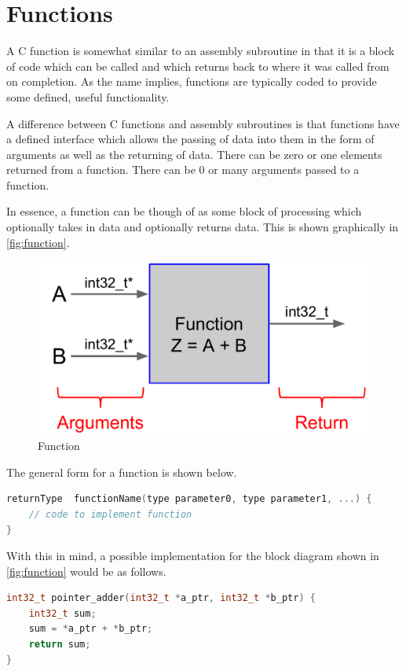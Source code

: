 \chapter{Functions}
A C function is somewhat similar to an assembly subroutine in that it is a block of code which can be called and which returns back to where it was called from on completion. As the name implies, functions are typically coded to provide some defined, useful functionality. 

A difference between C functions and assembly subroutines is that functions have a defined interface which allows the passing of data into them in the form of arguments as well as the returning of data. There can be zero or one elements returned from a function. There can be 0 or many arguments passed to a function.

In essence, a function can be though of as some block of processing which optionally takes in data and optionally returns data. This is shown graphically in \autoref{fig:function}.

\begin{figure}
\centering
\includegraphics[scale=0.5]{./fig/function.pdf}
\caption{Function}
\label{fig:function}
\end{figure}

The general form for a function is shown below.

\begin{lstlisting}[language=c]
returnType  functionName(type parameter0, type parameter1, ...) {
    // code to implement function
}
\end{lstlisting}

With this in mind, a possible implementation for the block diagram shown in \autoref{fig:function} would be as follows. 

\begin{lstlisting}[language=c]
int32_t pointer_adder(int32_t *a_ptr, int32_t *b_ptr) {
    int32_t sum;
    sum = *a_ptr + *b_ptr;
    return sum;
}
\end{lstlisting}

